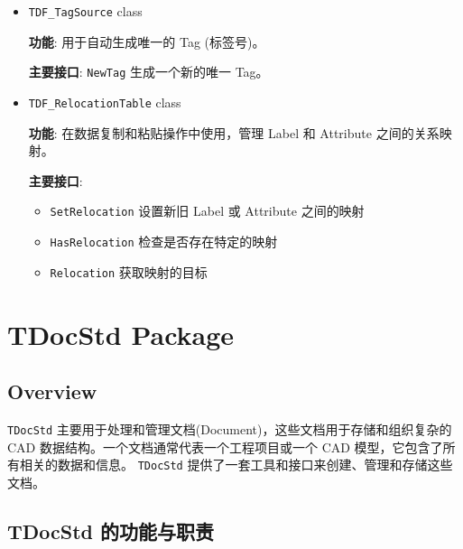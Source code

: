 \documentclass[11pt]{article}
\begin{document}
\begin{itemize}
\item \texttt{TDF\_TagSource} class

\textbf{功能}: 用于自动生成唯一的 Tag (标签号)。

\textbf{主要接口}: \texttt{NewTag} 生成一个新的唯一 Tag。

\item \texttt{TDF\_RelocationTable} class

\textbf{功能}: 在数据复制和粘贴操作中使用，管理 Label 和 Attribute 之间的关系映射。

\textbf{主要接口}:

\begin{itemize}
\item \texttt{SetRelocation} 设置新旧 Label 或 Attribute 之间的映射
\item \texttt{HasRelocation} 检查是否存在特定的映射
\item \texttt{Relocation} 获取映射的目标
\end{itemize}
\end{itemize}
\section{TDocStd Package}
\label{sec:org6104c37}

\subsection{Overview}
\label{sec:org0b1b8b4}
\texttt{TDocStd} 主要用于处理和管理文档(Document)，这些文档用于存储和组织复杂的 CAD 数据结构。一个文档通常代表一个工程项目或一个 CAD 模型，它包含了所有相关的数据和信息。 \texttt{TDocStd} 提供了一套工具和接口来创建、管理和存储这些文档。
\subsection{TDocStd 的功能与职责}
\label{sec:org301ce90}
\end{document}
